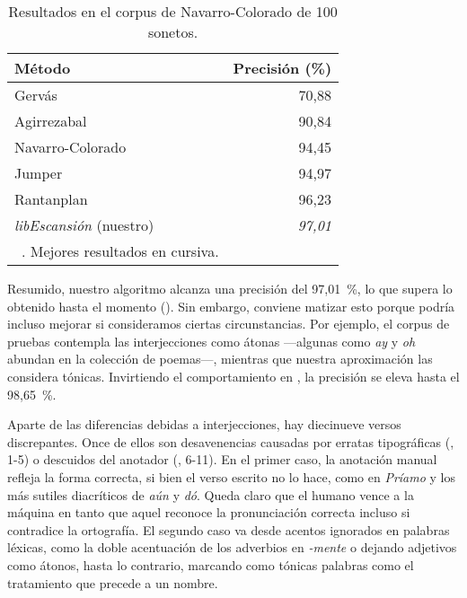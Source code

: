 \begin{table} [!ht]
	\begin{center}
		\begin{tabular} {lr}
			\toprule
			\textbf{Método} & \textbf{Precisión (\%)}\\
			\midrule
			Gervás & 70,88\\
			Agirrezabal &  90,84\\
			Navarro-Colorado & 94,45\\
			Jumper & 94,97\\
			Rantanplan & 96,23\\
			\textit{libEscansión}  (nuestro) & \textit{97,01} \\	
			\bottomrule
			{\scriptsize \citeauthor{marco2021}~\parencite*{marco2021}. Mejores resultados en cursiva.}&\\
		\end{tabular}
	\end{center}
	\caption{\label{tabla3}Resultados  en el corpus de Navarro-Colorado de 100 sonetos.}
\end{table}

Resumido, nuestro algoritmo alcanza una precisión del 97{,}01~\%, lo que supera lo obtenido hasta el momento (). Sin embargo, conviene matizar esto porque podría incluso mejorar si consideramos ciertas circunstancias. Por ejemplo, el corpus de pruebas contempla las interjecciones  como átonas —algunas como \textit{ay} y \textit{oh} abundan en la colección de poemas—, mientras que nuestra aproximación las considera tónicas. Invirtiendo el comportamiento en , la precisión se eleva hasta el 98{,}65~\%. 

Aparte de las diferencias debidas a interjecciones, hay diecinueve versos discrepantes. Once de ellos son desavenencias causadas por erratas tipográficas (, 1-5) o descuidos del anotador  (, 6-11). En el primer caso, la anotación manual refleja la forma correcta, si bien el verso escrito no lo hace, como en \textit{Príamo} y los más sutiles diacríticos de \textit{aún} y \textit{dó}. Queda claro que el humano vence a la máquina en tanto que aquel reconoce la pronunciación correcta incluso si contradice la ortografía. El segundo caso va desde acentos ignorados en palabras léxicas, como la doble acentuación de los adverbios en \textit{-mente} o dejando adjetivos como átonos, hasta lo contrario, marcando como tónicas palabras como el tratamiento que precede a un nombre. 

